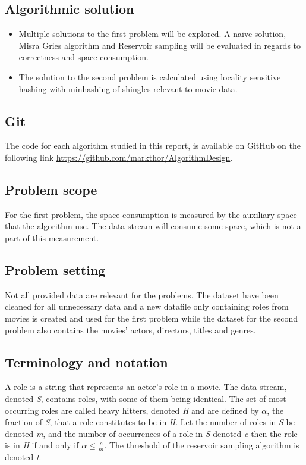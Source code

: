 \subsection{Algorithmic solution}
\begin{itemize}
	\item Multiple solutions to the first problem will be explored. A naïve solution, Misra Gries algorithm and Reservoir sampling will be evaluated in regards to correctness and space consumption.
	\item The solution to the second problem is calculated using locality sensitive hashing with minhashing of shingles relevant to movie data.
\end{itemize}

\subsection{Git}
The code for each algorithm studied in this report, is available on GitHub on the following link \url{https://github.com/markthor/AlgorithmDesign}.

\subsection{Problem scope}
For the first problem, the space consumption is measured by the auxiliary space that the algorithm use. The data stream will consume some space, which is not a part of this measurement.

\subsection{Problem setting}
Not all provided data are relevant for the problems. The dataset have been cleaned for all unnecessary data and a new datafile only containing roles from movies is created and used for the first problem while the dataset for the second problem also contains the movies' actors, directors, titles and genres.

\subsection{Terminology and notation}
A role is a string that represents an actor’s role in a movie. The data stream, denoted \textit{S}, contains roles, with some of them being identical. The set of most occurring roles are called heavy hitters, denoted \textit{H} and are defined by \(\alpha\), the fraction of \textit{S}, that a role constitutes to be in \textit{H}.
Let the number of roles in \textit{S} be denoted \textit{m}, and the number of occurrences of a role in \textit{S} denoted \textit{c} then the role is in \textit{H} if and only if \(\alpha \le \frac{c}{m}\). The threshold of the reservoir sampling algorithm is denoted \textit{t}.